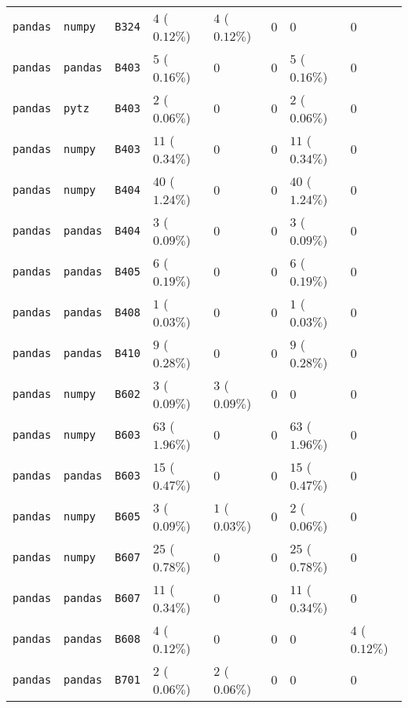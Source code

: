 \begin{table}
\begin{tabular}{llllllll}
\texttt{pandas} & \texttt{numpy} & \texttt{B324} & $4$ ($0.12\%$) & $4$ ($0.12\%$) & $0$ & $0$ & $0$ \\
\texttt{pandas} & \texttt{pandas} & \texttt{B403} & $5$ ($0.16\%$) & $0$ & $0$ & $5$ ($0.16\%$) & $0$ \\
\texttt{pandas} & \texttt{pytz} & \texttt{B403} & $2$ ($0.06\%$) & $0$ & $0$ & $2$ ($0.06\%$) & $0$ \\
\texttt{pandas} & \texttt{numpy} & \texttt{B403} & $11$ ($0.34\%$) & $0$ & $0$ & $11$ ($0.34\%$) & $0$ \\
\texttt{pandas} & \texttt{numpy} & \texttt{B404} & $40$ ($1.24\%$) & $0$ & $0$ & $40$ ($1.24\%$) & $0$ \\
\texttt{pandas} & \texttt{pandas} & \texttt{B404} & $3$ ($0.09\%$) & $0$ & $0$ & $3$ ($0.09\%$) & $0$ \\
\texttt{pandas} & \texttt{pandas} & \texttt{B405} & $6$ ($0.19\%$) & $0$ & $0$ & $6$ ($0.19\%$) & $0$ \\
\texttt{pandas} & \texttt{pandas} & \texttt{B408} & $1$ ($0.03\%$) & $0$ & $0$ & $1$ ($0.03\%$) & $0$ \\
\texttt{pandas} & \texttt{pandas} & \texttt{B410} & $9$ ($0.28\%$) & $0$ & $0$ & $9$ ($0.28\%$) & $0$ \\
\texttt{pandas} & \texttt{numpy} & \texttt{B602} & $3$ ($0.09\%$) & $3$ ($0.09\%$) & $0$ & $0$ & $0$ \\
\texttt{pandas} & \texttt{numpy} & \texttt{B603} & $63$ ($1.96\%$) & $0$ & $0$ & $63$ ($1.96\%$) & $0$ \\
\texttt{pandas} & \texttt{pandas} & \texttt{B603} & $15$ ($0.47\%$) & $0$ & $0$ & $15$ ($0.47\%$) & $0$ \\
\texttt{pandas} & \texttt{numpy} & \texttt{B605} & $3$ ($0.09\%$) & $1$ ($0.03\%$) & $0$ & $2$ ($0.06\%$) & $0$ \\
\texttt{pandas} & \texttt{numpy} & \texttt{B607} & $25$ ($0.78\%$) & $0$ & $0$ & $25$ ($0.78\%$) & $0$ \\
\texttt{pandas} & \texttt{pandas} & \texttt{B607} & $11$ ($0.34\%$) & $0$ & $0$ & $11$ ($0.34\%$) & $0$ \\
\texttt{pandas} & \texttt{pandas} & \texttt{B608} & $4$ ($0.12\%$) & $0$ & $0$ & $0$ & $4$ ($0.12\%$) \\
\texttt{pandas} & \texttt{pandas} & \texttt{B701} & $2$ ($0.06\%$) & $2$ ($0.06\%$) & $0$ & $0$ & $0$ \\
\bottomrule
\end{tabular}
\end{table}
